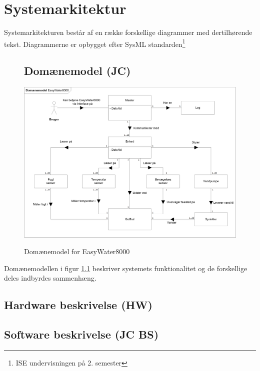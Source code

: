 \chapter{Systemarkitektur}
Systemarkitekturen består af en række forskellige diagrammer med dertilhørende tekst. Diagrammerne er opbygget efter SysML standarden\footnote{ISE undervisningen på 2. semester}

\begin{figure}[htbp] \centering
\section{Domænemodel (JC)}
{\includegraphics[width=\textwidth]{filer/systemarkitektur/Domainmodel}}
\caption{Domænemodel for EasyWater8000}
\label{lab:domainmodel}
\end{figure}
Domænemodellen i figur \ref{lab:domainmodel} beskriver systemets funktionalitet og de forskellige deles indbyrdes sammenhæng. 

\newpage
\section{Hardware beskrivelse (HW)}


\clearpage
\section{Software beskrivelse (JC BS)}
